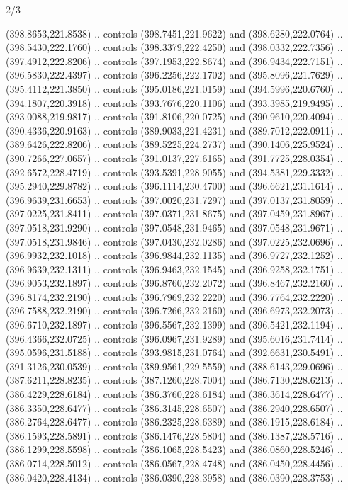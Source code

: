 \begin{flagdescription}{2/3}
\begin{scope}[xshift=0.5\flaglength,yshift=0.5\flagwidth,scale=\flagwidth/495.65]
\begin{scope}[y=0.8pt, x=0.8pt, yscale=-1,shift={(-463.76,-309.78)}]
  (398.8653,221.8538) .. controls (398.7451,221.9622) and (398.6280,222.0764) ..
  (398.5430,222.1760) .. controls (398.3379,222.4250) and (398.0332,222.7356) ..
  (397.4912,222.8206) .. controls (397.1953,222.8674) and (396.9434,222.7151) ..
  (396.5830,222.4397) .. controls (396.2256,222.1702) and (395.8096,221.7629) ..
  (395.4112,221.3850) .. controls (395.0186,221.0159) and (394.5996,220.6760) ..
  (394.1807,220.3918) .. controls (393.7676,220.1106) and (393.3985,219.9495) ..
  (393.0088,219.9817) .. controls (391.8106,220.0725) and (390.9610,220.4094) ..
  (390.4336,220.9163) .. controls (389.9033,221.4231) and (389.7012,222.0911) ..
  (389.6426,222.8206) .. controls (389.5225,224.2737) and (390.1406,225.9524) ..
  (390.7266,227.0657) .. controls (391.0137,227.6165) and (391.7725,228.0354) ..
  (392.6572,228.4719) .. controls (393.5391,228.9055) and (394.5381,229.3332) ..
  (395.2940,229.8782) .. controls (396.1114,230.4700) and (396.6621,231.1614) ..
  (396.9639,231.6653) .. controls (397.0020,231.7297) and (397.0137,231.8059) ..
  (397.0225,231.8411) .. controls (397.0371,231.8675) and (397.0459,231.8967) ..
  (397.0518,231.9290) .. controls (397.0548,231.9465) and (397.0548,231.9671) ..
  (397.0518,231.9846) .. controls (397.0430,232.0286) and (397.0225,232.0696) ..
  (396.9932,232.1018) .. controls (396.9844,232.1135) and (396.9727,232.1252) ..
  (396.9639,232.1311) .. controls (396.9463,232.1545) and (396.9258,232.1751) ..
  (396.9053,232.1897) .. controls (396.8760,232.2072) and (396.8467,232.2160) ..
  (396.8174,232.2190) .. controls (396.7969,232.2220) and (396.7764,232.2220) ..
  (396.7588,232.2190) .. controls (396.7266,232.2160) and (396.6973,232.2073) ..
  (396.6710,232.1897) .. controls (396.5567,232.1399) and (396.5421,232.1194) ..
  (396.4366,232.0725) .. controls (396.0967,231.9289) and (395.6016,231.7414) ..
  (395.0596,231.5188) .. controls (393.9815,231.0764) and (392.6631,230.5491) ..
  (391.3126,230.0539) .. controls (389.9561,229.5559) and (388.6143,229.0696) ..
  (387.6211,228.8235) .. controls (387.1260,228.7004) and (386.7130,228.6213) ..
  (386.4229,228.6184) .. controls (386.3760,228.6184) and (386.3614,228.6477) ..
  (386.3350,228.6477) .. controls (386.3145,228.6507) and (386.2940,228.6507) ..
  (386.2764,228.6477) .. controls (386.2325,228.6389) and (386.1915,228.6184) ..
  (386.1593,228.5891) .. controls (386.1476,228.5804) and (386.1387,228.5716) ..
  (386.1299,228.5598) .. controls (386.1065,228.5423) and (386.0860,228.5246) ..
  (386.0714,228.5012) .. controls (386.0567,228.4748) and (386.0450,228.4456) ..
  (386.0420,228.4134) .. controls (386.0390,228.3958) and (386.0390,228.3753) ..

\end{scope}
\end{scope}
\end{flagdescription}
